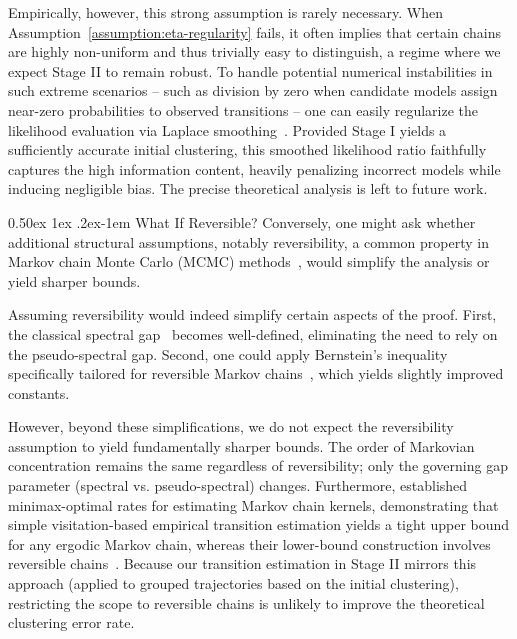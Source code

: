 \documentclass[twoside]{article}
\makeatletter
\renewcommand{\paragraph}{%
  \@startsection{paragraph}{4}%
  {\z@}{0.50ex \@plus 1ex \@minus .2ex}{-1em}%
  {\normalfont\normalsize\bfseries}%
}
\theoremstyle{plain}
\makeatother
\begin{document}
Empirically, however, this strong assumption is rarely necessary. When Assumption~\ref{assumption:eta-regularity} fails, it often implies that certain chains are highly non-uniform and thus trivially easy to distinguish, a regime where we expect Stage II to remain robust.
To handle potential numerical instabilities in such extreme scenarios -- such as division by zero when candidate models assign near-zero probabilities to observed transitions -- one can easily regularize the likelihood evaluation via Laplace smoothing~\citep{laplace1812}. Provided Stage I yields a sufficiently accurate initial clustering, this smoothed likelihood ratio faithfully captures the high information content, heavily penalizing incorrect models while inducing negligible bias.
The precise theoretical analysis is left to future work.


\paragraph{What If Reversible?}
Conversely, one might ask whether additional structural assumptions, notably reversibility, a common property in Markov chain Monte Carlo (MCMC) methods~\citep{mcmc}, would simplify the analysis or yield sharper bounds. 

Assuming reversibility would indeed simplify certain aspects of the proof.
First, the classical spectral gap~\citep{lezaud1998chernoff} becomes well-defined, eliminating the need to rely on the pseudo-spectral gap.
Second, one could apply Bernstein's inequality specifically tailored for reversible Markov chains~\citep[Theorem 3.9]{paulin2015markov}, which yields slightly improved constants.

However, beyond these simplifications, we do not expect the reversibility assumption to yield fundamentally sharper bounds. The order of Markovian concentration remains the same regardless of reversibility; only the governing gap parameter (spectral vs. pseudo-spectral) changes.
Furthermore, \citet{wolfer2021markov} established minimax-optimal rates for estimating Markov chain kernels, demonstrating that simple visitation-based empirical transition estimation yields a tight upper bound for any ergodic Markov chain, whereas their lower-bound construction involves reversible chains~\citep[Section 6.4]{wolfer2021markov}.
Because our transition estimation in Stage II mirrors this approach (applied to grouped trajectories based on the initial clustering), restricting the scope to reversible chains is unlikely to improve the theoretical clustering error rate.
\end{document}
